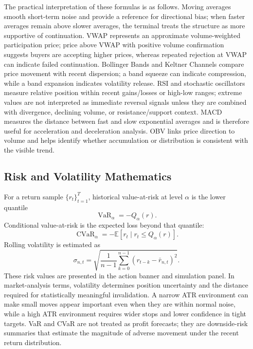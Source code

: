 \documentclass[conference]{IEEEtran}
\begin{document}
The practical interpretation of these formulas is as follows. Moving
averages smooth short-term noise and provide a reference for directional
bias; when faster averages remain above slower averages, the terminal treats
the structure as more supportive of continuation. VWAP represents an
approximate volume-weighted participation price; price above VWAP with
positive volume confirmation suggests buyers are accepting higher prices,
whereas repeated rejection at VWAP can indicate failed continuation.
Bollinger Bands and Keltner Channels compare price movement with recent
dispersion; a band squeeze can indicate compression, while a band expansion
indicates volatility release. RSI and stochastic oscillators measure
relative position within recent gains/losses or high-low ranges; extreme
values are not interpreted as immediate reversal signals unless they are
combined with divergence, declining volume, or resistance/support context.
MACD measures the distance between fast and slow exponential averages and is
therefore useful for acceleration and deceleration analysis. OBV links price
direction to volume and helps identify whether accumulation or distribution
is consistent with the visible trend.

\subsection{Risk and Volatility Mathematics}

For a return sample $\{r_t\}_{t=1}^{T}$, historical value-at-risk at level
$\alpha$ is the lower quantile
\begin{equation}
\operatorname{VaR}_{\alpha} = -Q_{\alpha}(r).
\end{equation}
Conditional value-at-risk is the expected loss beyond that quantile:
\begin{equation}
\operatorname{CVaR}_{\alpha} = -\mathbb{E}[r_t \mid r_t \le Q_{\alpha}(r)].
\end{equation}
Rolling volatility is estimated as
\begin{equation}
\sigma_{n,t} = \sqrt{\frac{1}{n-1}\sum_{k=0}^{n-1}(r_{t-k}-\bar{r}_{n,t})^2}.
\end{equation}
These risk values are presented in the action banner and simulation panel.
In market-analysis terms, volatility determines position uncertainty and the
distance required for statistically meaningful invalidation. A narrow ATR
environment can make small moves appear important even when they are within
normal noise, while a high ATR environment requires wider stops and lower
confidence in tight targets. VaR and CVaR are not treated as profit
forecasts; they are downside-risk summaries that estimate the magnitude of
adverse movement under the recent return distribution.
\end{document}
